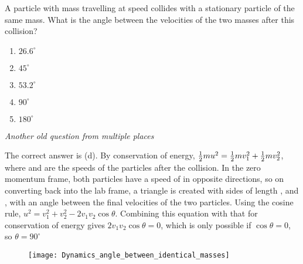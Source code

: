 \begin{problem} 
{A particle with mass  travelling at speed   collides with a stationary particle of the same mass. What is the angle between the velocities of the two masses after this collision?
\begin{enumerate}
	\item $26.6^{\circ}$
	\item $45^{\circ}$
	\item $53.2^{\circ}$
	\item $90^{\circ}$
	\item $180^{\circ}$
\end{enumerate}
}
{\textit{Another old question from multiple places}}
{The correct answer is (d). By conservation of energy, ${\textstyle \frac{1}{2}} mu^2 = {\textstyle \frac{1}{2}} mv_1^2 + {\textstyle \frac{1}{2}} mv_2^2$, where  and  are the speeds of the particles after the collision. In the zero momentum frame, both particles have a speed of  in opposite directions, so on converting back into the lab frame, a triangle is created with sides of length  ,   and  , with an angle \vari{\theta} between the final velocities of the two particles. Using the cosine rule, $u^2 = v_1^2 +v_2^2 - 2 v_1 v_2 \cos \theta$. Combining this equation with that for conservation of energy gives $2 v_1 v_2 \cos \theta = 0$, which is only possible if $\cos \theta = 0$, so $\theta = 90^{\circ}$

\begin{figure}[h]
	\centering
	\texttt{[image: Dynamics\_angle\_between\_identical\_masses]}
	\caption{}
	\label{fig:Dynamics_angle_between_identical_masses}
\end{figure}


}
\end{problem}
